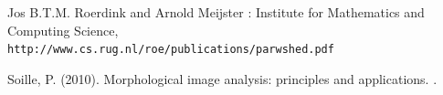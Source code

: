 \documentclass{article}
\begin{document}
\newpage

\begin{thebibliography}{9}
\label{sec:hello}



Jos B.T.M. Roerdink and Arnold Meijster : \newline
Institute for Mathematics and Computing Science, 
\\\texttt{http://www.cs.rug.nl/roe/publications/parwshed.pdf}


Soille, P. (2010). Morphological image analysis: principles and applications. 
. 

\end{thebibliography}
\end{document}
